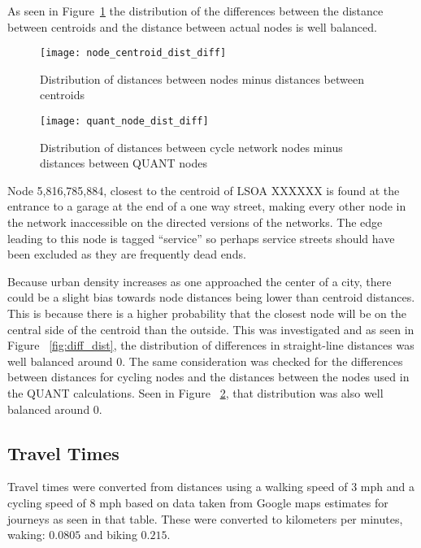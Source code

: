 As seen in Figure~\ref{fig:dist_diffs} the distribution of the differences between the distance between centroids and the distance between actual nodes is well balanced. 

\begin{figure}
\centering
\texttt{[image: node\_centroid\_dist\_diff]}
\caption{Distribution of distances between nodes minus distances between centroids}
\label{fig:dist_diffs}
\end{figure}

\begin{figure}
\centering
\texttt{[image: quant\_node\_dist\_diff]}
\caption{Distribution of distances between cycle network nodes minus distances between QUANT nodes}
\label{fig:quant_dist_diffs}
\end{figure}

Node 5,816,785,884, closest to the centroid of LSOA XXXXXX is found at the entrance to a garage at the end of a one way street, making every other node in the network inaccessible on the directed versions of the networks. The edge leading to this node is tagged ``service'' so perhaps service streets should have been excluded as they are frequently dead ends. 

Because urban density increases as one approached the center of a city, there could be a slight bias towards node distances being lower than centroid distances. This is because there is a higher probability that the closest node will be on the central side of the centroid than the outside. This was investigated and as seen in Figure ~\ref{fig:diff_dist}, the distribution of differences in straight-line distances was well balanced around 0. The same consideration was checked for the differences between distances for cycling nodes and the distances between the nodes used in the QUANT calculations. Seen in Figure ~\ref{fig:quant_dist_diffs}, that distribution was also well balanced around 0. 


\subsection{Travel Times}

Travel times were converted from distances using a walking speed of 3 mph and a cycling speed of 8 mph based on data taken from Google maps estimates for journeys as seen in that table. These were converted to kilometers per minutes, waking: $0.0805$ and biking $0.215$. 

